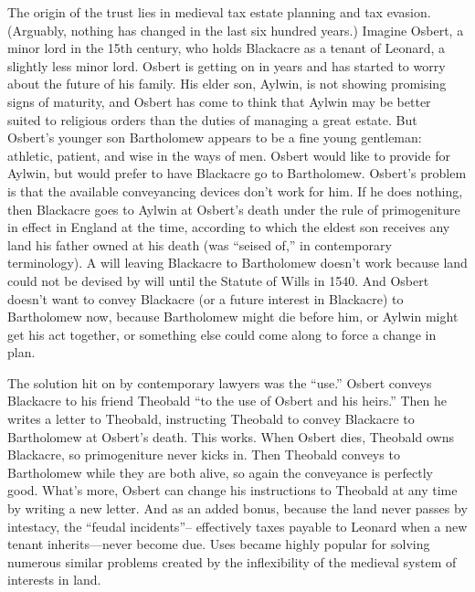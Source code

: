 
The origin of the trust lies in medieval tax estate planning and tax evasion.
(Arguably, nothing has changed in the last six hundred years.) Imagine Osbert, a
minor lord in the 15th century, who holds Blackacre as a tenant of Leonard, a
slightly less minor lord. Osbert is getting on in years and has started to worry
about the future of his family. His elder son, Aylwin, is not showing promising
signs of maturity, and Osbert has come to think that Aylwin may be better suited
to religious orders than the duties of managing a great estate. But Osbert's
younger son Bartholomew appears to be a fine young gentleman: athletic, patient,
and wise in the ways of men. Osbert would like to provide for Aylwin, but would
prefer to have Blackacre go to Bartholomew. Osbert's problem is that the
available conveyancing devices don't work for him. If he does nothing, then
Blackacre goes to Aylwin at Osbert's death under the rule of primogeniture in
effect in England at the time, according to which the eldest son receives any
land his father owned at his death (was ``seised of,'' in contemporary
terminology). A will leaving Blackacre to Bartholomew doesn't work because land
could not be devised by will until the Statute of Wills in 1540. And Osbert
doesn't want to convey Blackacre (or a future interest in Blackacre) to
Bartholomew now, because Bartholomew might die before him, or Aylwin might get
his act together, or something else could come along to force a change in plan.

The solution hit on by contemporary lawyers was the ``use.'' Osbert conveys
Blackacre to his friend Theobald ``to the use of Osbert and his heirs.'' Then he
writes a letter to Theobald, instructing Theobald to convey Blackacre to
Bartholomew at Osbert's death. This works. When Osbert dies, Theobald owns
Blackacre, so primogeniture never kicks in. Then Theobald conveys to Bartholomew
while they are both alive, so again the conveyance is perfectly good. What's
more, Osbert can change his instructions to Theobald at any time by writing a
new letter. And as an added bonus, because the land never passes by intestacy,
the ``feudal incidents''-- effectively taxes payable to Leonard when a new
tenant inherits---never become due. Uses became highly popular for solving
numerous similar problems created by the inflexibility of the medieval system of
interests in land.


